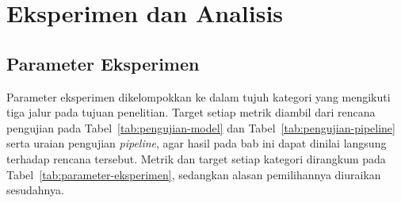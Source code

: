 \chapter{Eksperimen dan Analisis}

\section{Parameter Eksperimen}

Parameter eksperimen dikelompokkan ke dalam tujuh kategori yang mengikuti tiga jalur pada tujuan penelitian. Target setiap metrik diambil dari rencana pengujian pada Tabel~\ref{tab:pengujian-model} dan Tabel~\ref{tab:pengujian-pipeline} serta uraian pengujian \textit{pipeline}, agar hasil pada bab ini dapat dinilai langsung terhadap rencana tersebut. Metrik dan target setiap kategori dirangkum pada Tabel~\ref{tab:parameter-eksperimen}, sedangkan alasan pemilihannya diuraikan sesudahnya.

